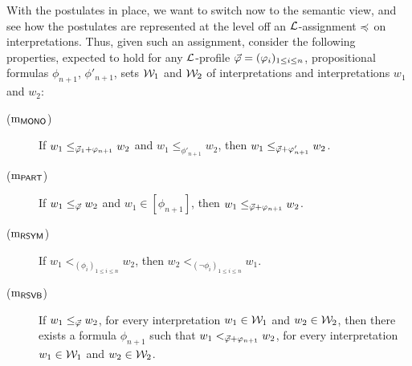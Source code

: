 
With the postulates in place, we want to switch now to the semantic
view, and see how the postulates are represented at the level off
an $\L$-assignment $\as$ on interpretations.
Thus, given such an assignment, 
consider the following properties,
expected to hold for any $\L$-profile $\P=(\phi_i)_{1\le i \le n}$,
propositional formulas $\phi_{n+1}$, $\phi'_{n+1}$,
sets $\W_1$ and $\W_2$ of interpretations
and interpretations $w_1$ and $w_2$:

\begin{description}
	\item[($\oom{\MONO}$)] If $w_1\le_{\P_1+\phi_{n+1}}w_2$ and $w_1\le_{\phi'_{n+1}}w_2$, then $w_1\le_{\P+\phi'_{n+1}}w_2$.
	\item[($\oom{\PART}$)] If $w_1 \le_{\P}w_2$ and $w_1\in[\phi_{n+1}]$, then $w_1 \le_{\P+\phi_{n+1}}w_2$. 
	\item[($\oom{\RSYM}$)] If $w_1 <_{(\phi_i)_{1\le i \le n}}w_2$, then $w_2<_{(\lnot\phi_i)_{1\le i \le n}}w_1$. 
	\item[($\oom{\RSVB}$)] If $w_1 \le_{\P}w_2$, for every interpretation $w_1\in\W_1$ and $w_2\in\W_2$,
		then there exists a formula $\phi_{n+1}$ such that $w_1<_{\P+\phi_{n+1}}w_2$, 
		for every interpretation $w_1\in\W_1$ and $w_2\in\W_2$.
\end{description}

